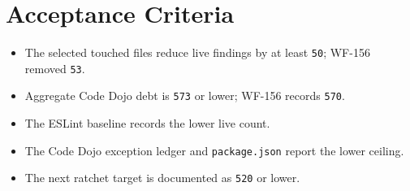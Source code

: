 \section{Acceptance Criteria}\label{record-238-acceptance-criteria}

\begin{itemize}
\tightlist
\item
  The selected touched files reduce live findings by at least \texttt{5\allowbreak{}0}; WF-156 removed \texttt{5\allowbreak{}3}.
\item
  Aggregate Code Dojo debt is \texttt{5\allowbreak{}7\allowbreak{}3} or lower; WF-156 records \texttt{5\allowbreak{}7\allowbreak{}0}.
\item
  The ESLint baseline records the lower live count.
\item
  The Code Dojo exception ledger and \texttt{p\allowbreak{}a\allowbreak{}c\allowbreak{}k\allowbreak{}a\allowbreak{}g\allowbreak{}e\allowbreak{}.\allowbreak{}j\allowbreak{}s\allowbreak{}o\allowbreak{}n} report the lower ceiling.
\item
  The next ratchet target is documented as \texttt{5\allowbreak{}2\allowbreak{}0} or lower.
\end{itemize}

